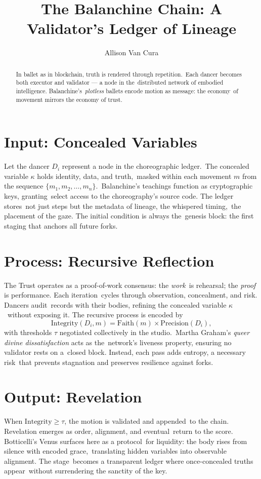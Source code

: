 \documentclass[12pt]{article}
\begin{document}
\title{\textbf{The Balanchine Chain: A Validator's Ledger of Lineage}}
\author{Allison Van Cura}
\date{}

\maketitle

\begin{abstract}
In ballet as in blockchain, truth is rendered through repetition.\
Each dancer becomes both executor and validator --- a node in the\
distributed network of embodied intelligence. Balanchine's\
\textit{plotless} ballets encode motion as message: the economy\
of movement mirrors the economy of trust.
\end{abstract}

\section{Input: Concealed Variables}
Let the dancer $D_i$ represent a node in the choreographic ledger.\
The concealed variable $\kappa$ holds identity, data, and truth,\
masked within each movement $m$ from the sequence $\{m_1, m_2, \ldots, m_n\}$.\
Balanchine's teachings function as cryptographic keys, granting\
select access to the choreography's source code. The ledger stores\
not just steps but the metadata of lineage, the whispered timing,\
the placement of the gaze. The initial condition is always the\
genesis block: the first staging that anchors all future forks.

\section{Process: Recursive Reflection}
The Trust operates as a proof-of-work consensus: the \textit{work}\
is rehearsal; the \textit{proof} is performance. Each iteration\
cycles through observation, concealment, and risk. Dancers audit\
records with their bodies, refining the concealed variable $\kappa$\
without exposing it. The recursive process is encoded by
\[
\text{Integrity}(D_i, m) = \text{Faith}(m) \times \text{Precision}(D_i),
\]
with thresholds $\tau$ negotiated collectively in the studio.\
Martha Graham's \emph{queer divine dissatisfaction} acts as the\
network's liveness property, ensuring no validator rests on a\
closed block. Instead, each pass adds entropy, a necessary risk\
that prevents stagnation and preserves resilience against forks.

\section{Output: Revelation}
When $\text{Integrity} \geq \tau$, the motion is validated and appended\
to the chain. Revelation emerges as order, alignment, and eventual\
return to the score. Botticelli's Venus surfaces here as a protocol\
for liquidity: the body rises from silence with encoded grace,\
translating hidden variables into observable alignment. The stage\
becomes a transparent ledger where once-concealed truths appear\
without surrendering the sanctity of the key.
\end{document}
